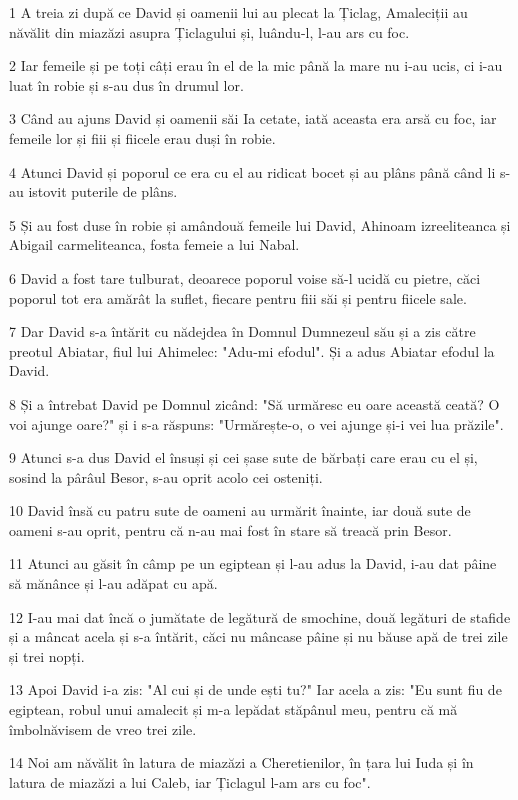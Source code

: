 \par 1 A treia zi după ce David și oamenii lui au plecat la Țiclag, Amaleciții au năvălit din miazăzi asupra Țiclagului și, luându-l, l-au ars cu foc.
\par 2 Iar femeile și pe toți câți erau în el de la mic până la mare nu i-au ucis, ci i-au luat în robie și s-au dus în drumul lor.
\par 3 Când au ajuns David și oamenii săi Ia cetate, iată aceasta era arsă cu foc, iar femeile lor și fiii și fiicele erau duși în robie.
\par 4 Atunci David și poporul ce era cu el au ridicat bocet și au plâns până când li s-au istovit puterile de plâns.
\par 5 Și au fost duse în robie și amândouă femeile lui David, Ahinoam izreeliteanca și Abigail carmeliteanca, fosta femeie a lui Nabal.
\par 6 David a fost tare tulburat, deoarece poporul voise să-l ucidă cu pietre, căci poporul tot era amărât la suflet, fiecare pentru fiii săi și pentru fiicele sale.
\par 7 Dar David s-a întărit cu nădejdea în Domnul Dumnezeul său și a zis către preotul Abiatar, fiul lui Ahimelec: "Adu-mi efodul". Și a adus Abiatar efodul la David.
\par 8 Și a întrebat David pe Domnul zicând: "Să urmăresc eu oare această ceată? O voi ajunge oare?" și i s-a răspuns: "Urmărește-o, o vei ajunge și-i vei lua prăzile".
\par 9 Atunci s-a dus David el însuși și cei șase sute de bărbați care erau cu el și, sosind la pârâul Besor, s-au oprit acolo cei osteniți.
\par 10 David însă cu patru sute de oameni au urmărit înainte, iar două sute de oameni s-au oprit, pentru că n-au mai fost în stare să treacă prin Besor.
\par 11 Atunci au găsit în câmp pe un egiptean și l-au adus la David, i-au dat pâine să mănânce și l-au adăpat cu apă.
\par 12 I-au mai dat încă o jumătate de legătură de smochine, două legături de stafide și a mâncat acela și s-a întărit, căci nu mâncase pâine și nu băuse apă de trei zile și trei nopți.
\par 13 Apoi David i-a zis: "Al cui și de unde ești tu?" Iar acela a zis: "Eu sunt fiu de egiptean, robul unui amalecit și m-a lepădat stăpânul meu, pentru că mă îmbolnăvisem de vreo trei zile.
\par 14 Noi am năvălit în latura de miazăzi a Cheretienilor, în țara lui Iuda și în latura de miazăzi a lui Caleb, iar Țiclagul l-am ars cu foc".
